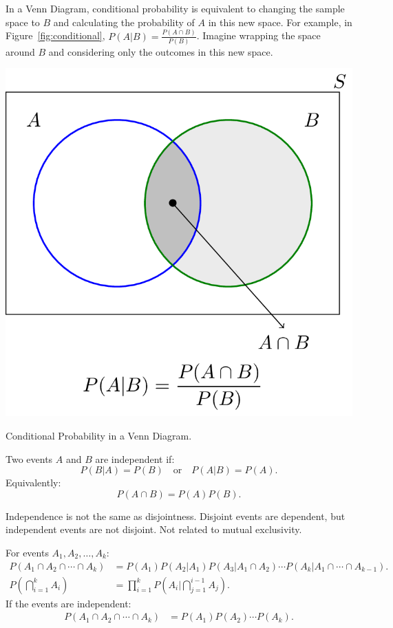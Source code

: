\documentclass{article}
\begin{document}
In a Venn Diagram, conditional probability is equivalent to changing the sample space to \( B \) and calculating the probability of \( A \) in this new space. For example, in Figure~\ref{fig:conditional}, \( P(A|B) = \frac{P(A \cap B)}{P(B)} \). Imagine wrapping the space around \( B \) and considering only the outcomes in this new space.

\begin{marginfigure}
    \centering
    \includegraphics[width=\textwidth]{images/20250110_153104.png}
    \caption{Conditional Probability in a Venn Diagram.}
    \label{fig:conditional}
\end{marginfigure}

\begin{definition}
Two events \( A \) and \( B \) are independent if:
\[
    P(B|A) = P(B) \quad \text{or} \quad P(A|B) = P(A)
.\] 
Equivalently:
    \[
    P(A \cap B) = P(A)P(B)
    .\] 
\end{definition}

Independence is not the same as disjointness. Disjoint events are dependent, but independent events are not disjoint. Not related to mutual exclusivity.

\begin{theorem}
For events \( A_1, A_2, \ldots, A_k \):
\begin{align}
    P(A_1 \cap A_2 \cap \cdots \cap A_k) &= P(A_1)P(A_2|A_1)P(A_3|A_1 \cap A_2)\cdots P(A_k|A_1 \cap \cdots \cap A_{k-1}). \\
    P(\bigcap_{i=1}^k A_{i} ) &= \prod_{i=1}^k P(A_i|\bigcap_{j=1}^{i-1} A_j).
\end{align}
If the events are independent:
\begin{align}
    P(A_1 \cap A_2 \cap \cdots \cap A_k) &= P(A_1)P(A_2)\cdots P(A_k).
\end{align}
\label{thm:general_multiplicative_rule}
\end{theorem}
\end{document}
